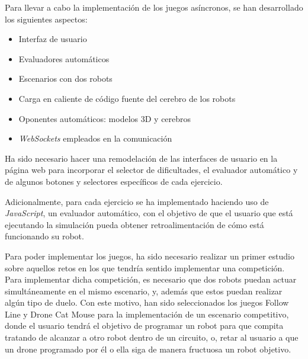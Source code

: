 \documentclass[a4paper, 12pt]{book}
\begin{document}
Para llevar a cabo la implementación de los juegos asíncronos, se han desarrollado los siguientes aspectos:

\begin{itemize}
\item Interfaz de usuario
\item Evaluadores automáticos
\item Escenarios con dos robots
\item Carga en caliente de código fuente del cerebro de los robots
\item Oponentes automáticos: modelos 3D y cerebros
\item \emph{WebSockets} empleados en la comunicación
\end{itemize}


Ha sido necesario hacer una remodelación de las interfaces de usuario en la página web para incorporar el selector de dificultades, el evaluador automático y de algunos botones y selectores específicos de cada ejercicio.


Adicionalmente, para cada ejercicio se ha implementado haciendo uso de \emph{JavaScript}, un evaluador automático, con el objetivo de que el usuario que está ejecutando la simulación pueda obtener retroalimentación de cómo está funcionando su robot.


Para poder implementar los juegos, ha sido necesario realizar un primer estudio sobre aquellos retos en los que tendría sentido implementar una competición.  Para implementar dicha competición, es necesario que dos robots puedan actuar simultáneamente en el mismo escenario, y, además que estos puedan realizar algún tipo de duelo. Con este motivo, han sido seleccionados los juegos Follow Line y Drone Cat Mouse para la implementación de un escenario competitivo, donde el usuario tendrá el objetivo de programar un robot para que compita tratando de alcanzar a otro robot dentro de un circuito, o, retar al usuario a que un drone programado por él o ella siga de manera fructuosa un robot objetivo.
\end{document}
